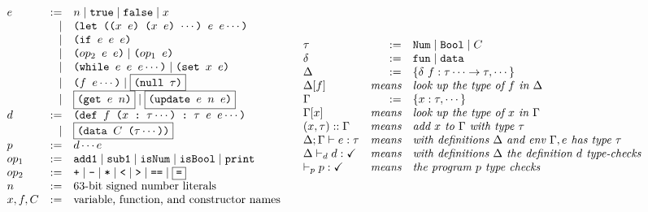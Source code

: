 \documentclass[10pt, oneside]{article}
\begin{document}
\[
\begin{array}{ll}
\begin{array}{lrl}
e & := & n \mid \texttt{true} \mid \texttt{false} \mid x \\
  & \mid  & \texttt{(let (($x\ e$) ($x\ e$) $\cdots$) $e\ e \cdots$)} \\
  & \mid  & \texttt{(if $e\ e \ e$)} \\
  & \mid  & \texttt{($op_2$ $e\ e$)} \mid \texttt{($op_1$ $e$)} \\
  & \mid  & \texttt{(while $e\ e\ e \cdots$)} \mid \texttt{(set $x\ e$)} \\
  & \mid  & \texttt{($f\ e\cdots$)} \mid \fbox{\texttt{(null $\tau$)}} \\
  & \mid  & \fbox{\texttt{(get $e$ $n$)}} \mid \fbox{\texttt{(update $e$ $n$ $e$)}} \\
d & := & \texttt{(def $f$ ($x\ $:$\ \tau \cdots$) :$\ \tau$ $e\ e \cdots$)} \\
  & \mid  & \fbox{\texttt{(data $C$ ($\tau \cdots$))}} \\
p & := & d \cdots e \\
op_1 & := & \texttt{add1} \mid \texttt{sub1} \mid \texttt{isNum} \mid \texttt{isBool} \mid \texttt{print} \\
op_2 & := & \texttt{+} \mid \texttt{-} \mid \texttt{*} \mid \texttt{<} \mid \texttt{>} \mid \texttt{==} \mid \fbox{\texttt{=}} \\
n & := & \textrm{63-bit signed number literals} \\
x,f,C & := & \textrm{variable, function, and constructor names} \\
\end{array}
&
\begin{array}{lrl}
\tau & := & \texttt{Num} \mid \texttt{Bool} \mid C \\
\delta & := & \texttt{fun} \mid \texttt{data} \\
\Delta & := & \{\delta\ f: \tau \cdots \rightarrow \tau, \cdots\} \\
\Delta[f] & \textit{means} & \textit{look up the type of } f \textit{ in } \Delta \\
\Gamma & := & \{x:\tau,\cdots\} \\
\Gamma[x] & \textit{means} & \textit{look up the type of } x \textit{ in } \Gamma \\
(x,\tau)::\Gamma & \textit{means} & \textit{add } x \textit{ to } \Gamma \textit{ with type } \tau \\
\Delta;\Gamma \vdash e : \tau & \textit{means} & \textit{with definitions } \Delta \textit{ and env } \Gamma, e \textit{ has type } \tau \\
\Delta \vdash_d d : \checkmark & \textit{means} & \textit{with definitions } \Delta \textit{ the definition } d \textit{ type-checks} \\
\vdash_p p : \checkmark & \textit{means} & \textit{the program } p \textit{ type checks } \\
\end{array}
\end{array}
\]
\end{document}
